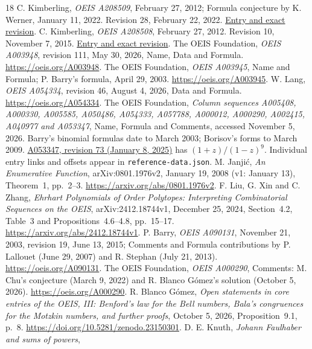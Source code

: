 \documentclass[11pt]{article}
\begin{document}
\begin{thebibliography}{18}\small
{}
C. Kimberling, \emph{OEIS A208509}, February 27, 2012;
Formula conjecture by K. Werner, January 11, 2022.
Revision 28, February 22, 2022.
\href{https://oeis.org/history/view?seq=A208509\&v=28}{Entry and exact revision}.
C. Kimberling, \emph{OEIS A208508}, February 27, 2012.
Revision 10, November 7, 2015.
\href{https://oeis.org/history/view?seq=A208508\&v=10}{Entry and exact revision}.
The OEIS Foundation, \emph{OEIS A003948}, revision 111, May 30, 2026,
Name, Data and Formula. \url{https://oeis.org/A003948}.
The OEIS Foundation, \emph{OEIS A003945}, Name and Formula;
P. Barry's formula, April 29, 2003.
\url{https://oeis.org/A003945}.
W. Lang, \emph{OEIS A054334}, revision 46, August 4, 2026,
Data and Formula. \url{https://oeis.org/A054334}.
The OEIS Foundation, \emph{Column sequences A005408, A000330, A005585,
A050486, A054333, A057788, A000012, A000290, A002415, A040977 and A053347},
Name, Formula and Comments, accessed November 5, 2026.
Barry's binomial formulas date to March 2003; Borisov's forms to March 2009.
\href{https://oeis.org/A053347}{A053347, revision 73 (January 8, 2025)}
has $(1+z)/(1-z)^9$. Individual entry links and offsets appear in
\texttt{reference-data.json}.
M. Janji\'c, \emph{An Enumerative Function}, arXiv:0801.1976v2,
January 19, 2008 (v1: January 13), Theorem~1, pp.~2--3.
\url{https://arxiv.org/abs/0801.1976v2}.
F. Liu, G. Xin and C. Zhang, \emph{Ehrhart Polynomials of Order Polytopes:
Interpreting Combinatorial Sequences on the OEIS}, arXiv:2412.18744v1,
December 25, 2024, Section~4.2, Table~3 and Propositions~4.6--4.8,
pp.~15--17. \url{https://arxiv.org/abs/2412.18744v1}.
P. Barry, \emph{OEIS A090131}, November 21, 2003, revision 19,
June 13, 2015; Comments and Formula contributions by P. Lallouet
(June 29, 2007) and R. Stephan (July 21, 2013).
\url{https://oeis.org/A090131}.
The OEIS Foundation, \emph{OEIS A000290}, Comments: M. Chu's conjecture
(March 9, 2022) and R. Blanco G\'omez's solution (October 5, 2026).
\url{https://oeis.org/A000290}.
R. Blanco G\'omez, \emph{Open statements in core entries of the OEIS, III:
Benford's law for the Bell numbers, Bala's congruences for the Motzkin
numbers, and further proofs}, October 5, 2026, Proposition~9.1, p.~8.
\url{https://doi.org/10.5281/zenodo.23150301}.
D. E. Knuth, \emph{Johann Faulhaber and sums of powers},

\end{thebibliography}
\end{document}
